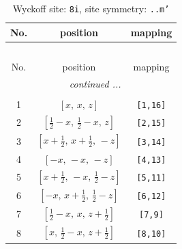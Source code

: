 \documentclass[fleqn,8pt]{jsarticle}
\begin{document}
\begin{longtable}{ccc}
\caption{Wyckoff site: {\tt 8i}, site symmetry: {\tt ..m'}}
 \\
 \hline \hline
No. & position & mapping \\ \hline \endfirsthead

\multicolumn{2}{l}{\tablename\ \thetable{}} \\
 \hline \hline
No. & position & mapping \\ \hline \endhead

 \hline \hline
\multicolumn{2}{r}{\footnotesize\it continued ...} \\ \endfoot

 \hline \hline
\multicolumn{2}{r}{} \\ \endlastfoot

1 & $\left[ x,\, x,\, z \right]$ & {\tt [1,16]} \\ \hline
2 & $\left[ \frac{1}{2} - x,\, \frac{1}{2} - x,\, z \right]$ & {\tt [2,15]} \\ \hline
3 & $\left[ x + \frac{1}{2},\, x + \frac{1}{2},\, - z \right]$ & {\tt [3,14]} \\ \hline
4 & $\left[ - x,\, - x,\, - z \right]$ & {\tt [4,13]} \\ \hline
5 & $\left[ x + \frac{1}{2},\, - x,\, \frac{1}{2} - z \right]$ & {\tt [5,11]} \\ \hline
6 & $\left[ - x,\, x + \frac{1}{2},\, \frac{1}{2} - z \right]$ & {\tt [6,12]} \\ \hline
7 & $\left[ \frac{1}{2} - x,\, x,\, z + \frac{1}{2} \right]$ & {\tt [7,9]} \\ \hline
8 & $\left[ x,\, \frac{1}{2} - x,\, z + \frac{1}{2} \right]$ & {\tt [8,10]} \\
\end{longtable}
\renewcommand{\arraystretch}{1.2}
\end{document}
